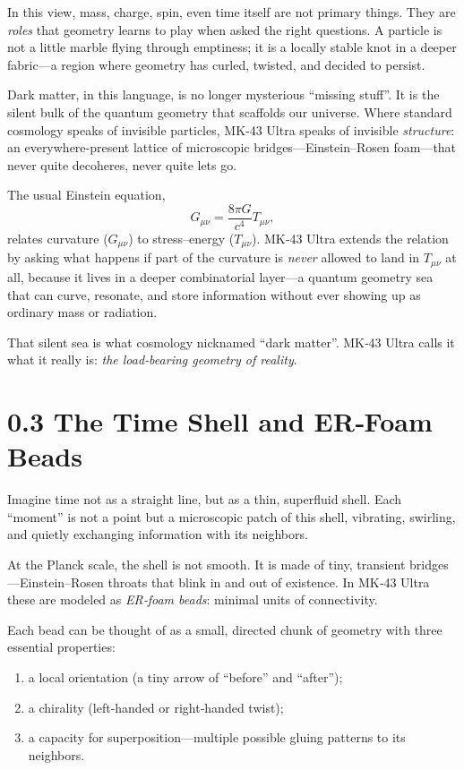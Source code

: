In this view, mass, charge, spin, even time itself are not primary things. They are \emph{roles} that geometry learns to play when asked the right questions. A particle is not a little marble flying through emptiness; it is a locally stable knot in a deeper fabric---a region where geometry has curled, twisted, and decided to persist.

Dark matter, in this language, is no longer mysterious ``missing stuff''. It is the silent bulk of the quantum geometry that scaffolds our universe. Where standard cosmology speaks of invisible particles, MK‑43 Ultra speaks of invisible \emph{structure}: an everywhere-present lattice of microscopic bridges---Einstein–Rosen foam---that never quite decoheres, never quite lets go.

The usual Einstein equation,
\begin{equation}
G_{\mu\nu} = \frac{8\pi G}{c^4} T_{\mu\nu},
\end{equation}
relates curvature ($G_{\mu\nu}$) to stress–energy ($T_{\mu\nu}$). MK‑43 Ultra extends the relation by asking what happens if part of the curvature is \emph{never} allowed to land in $T_{\mu\nu}$ at all, because it lives in a deeper combinatorial layer---a quantum geometry sea that can curve, resonate, and store information without ever showing up as ordinary mass or radiation.

That silent sea is what cosmology nicknamed ``dark matter''. MK‑43 Ultra calls it what it really is: \emph{the load‑bearing geometry of reality}.

\section*{0.3 The Time Shell and ER‑Foam Beads}

Imagine time not as a straight line, but as a thin, superfluid shell. Each ``moment'' is not a point but a microscopic patch of this shell, vibrating, swirling, and quietly exchanging information with its neighbors.

At the Planck scale, the shell is not smooth. It is made of tiny, transient bridges---Einstein–Rosen throats that blink in and out of existence. In MK‑43 Ultra these are modeled as \emph{ER‑foam beads}: minimal units of connectivity.

Each bead can be thought of as a small, directed chunk of geometry with three essential properties:
\begin{enumerate}
  \item a local orientation (a tiny arrow of ``before'' and ``after'');
  \item a chirality (left‑handed or right‑handed twist);
  \item a capacity for superposition---multiple possible gluing patterns to its neighbors.
\end{enumerate}

